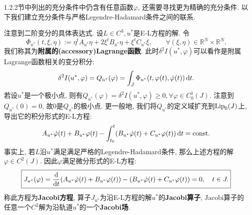 \documentclass[12pt,a4paper]{article}
\begin{document}
1.2.2节中列出的充分条件中仍含有任意函数$\varphi$, 还需要寻找更为精确的充分条件.
以下我们建立充分条件与严格Legendre-Hadamard条件之间的联系.

注意到二阶变分的具体表达式. 设$L \in C^3, u^*$是E-L方程的解. 令 
\begin{equation*}
    \boxed{\Phi_{u^*}(t, \xi, \eta) := \eta^tA_{u^*}\eta+2\xi^tB_{u^*}\eta+\xi^tC_{u^*}\xi, \qquad \forall(\xi, \eta) \in \mathbb{R}^N \times \mathbb{R}^N.}
\end{equation*}
我们称其为\textbf{附属的(accessory)Lagrange函数}. 此时$\delta^2I(u^*, \varphi)$可以看作是附属Lagrange函数相关的变分积分:
\begin{equation*}
    \delta^2I(u^*, \varphi) = Q_{u^*}(\varphi)=\int_J\Phi_{u^*}(t, \varphi(t), \dot\varphi(t)) \,{\rm d}t.
\end{equation*}
若设$u^*$是一个极小点, 则有$Q_{u^*}(\varphi) = \delta^2I(u^*, \varphi) \geq 0, \forall\varphi \in C_0^1(J)$.
注意到$Q_{u^*}(0) = 0$, 故$0$是$Q_{u^*}$的极小点. 更一般地, 我们将$Q_{u^*}$的定义域扩充到${\rm Lip}_0(J)$上, 导出它的积分形式的E-L方程:
\begin{equation*}
    A_{u^*}\dot\varphi(t) + B_{u^*}\varphi(t) - \int_{t_0}^t(B_{u^*}\dot\varphi(t) + C_{u^*}\varphi(t)) \,{\rm d}t = {\rm const}. 
\end{equation*}
事实上, 若$L$沿$u^*$满足满足严格的Legendre-Hadamard条件, 那么上述方程的解$\varphi \in C^2(J)$.
因此$\varphi$满足微分形式的E-L方程:
\begin{equation*}
    \boxed{J_{u^*}(\varphi)= \frac{{\rm d}}{{\rm d}t}(A_{u^*}\dot\varphi(t) + B_{u^*}\varphi(t)) - (B_{u^*}\dot\varphi(t) + C_{u^*}\varphi(t)) = 0, \quad t \in J.}
\end{equation*}
称此方程为\textbf{Jacobi方程}, 算子$J_{u^*}$为沿E-L方程的解$u^*$的\textbf{Jacobi算子}, Jacobi算子的任意一个$C^2$解为沿轨道$u^*$的一个\textbf{Jacobi场}.
\end{document}
